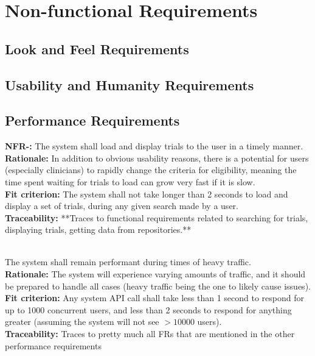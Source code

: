 \documentclass[12pt, titlepage]{article}
\newcounter{NFR_Counter}
\newcounter{FR_Counter}
\begin{document}
\section{Non-functional Requirements}

\subsection{Look and Feel Requirements}

\subsection{Usability and Humanity Requirements}

\subsection{Performance Requirements}

\textbf{NFR-\the\value{NFR_Counter}:}
The system shall load and display trials to the user in a timely manner.\\
\textbf{Rationale:}
In addition to obvious usability reasons, there is a potential for users (especially clinicians) to rapidly
change the criteria for eligibility, meaning the time spent waiting for trials to load can grow very fast if it is slow.\\
\textbf{Fit criterion:}
The system shall not take longer than 2 seconds to load and display a set of trials, during any given search made by a user.\\
\textbf{Traceability:}
**Traces to functional requirements related to searching for trials, displaying trials, getting data from repositories.** \\~\\
\addtocounter{NFR_Counter}{1}

The system shall remain performant during times of heavy traffic.\\
\textbf{Rationale:}
The system will experience varying amounts of traffic, and it should be prepared to handle all cases (heavy traffic being the 
one to likely cause issues).\\
\textbf{Fit criterion:}
Any system API call shall take less than 1 second to respond for up to 1000 concurrent users, and less than 2 seconds to respond for anything 
greater (assuming the system will not see $>10000$ users).\\
\textbf{Traceability:}
Traces to pretty much all FRs that are mentioned in the other performance requirements \\~\\
\addtocounter{NFR_Counter}{1}
\end{document}
